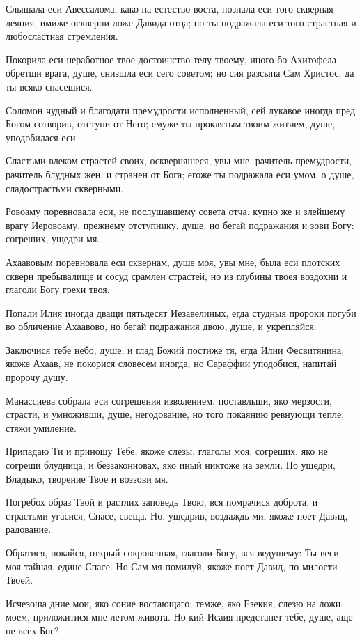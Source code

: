 Слышала еси Авессалома, како на естество воста, познала еси того скверная деяния, имиже оскверни ложе Давида отца; но ты подражала еси того страстная и любосластная стремления.

Покорила еси неработное твое достоинство телу твоему, иного бо Ахитофела обретши врага, душе, снизшла еси сего советом; но сия разсыпа Сам Христос, да ты всяко спасешися.

Соломон чудный и благодати премудрости исполненный, сей лукавое иногда пред Богом сотворив, отступи от Него; емуже ты проклятым твоим житием, душе, уподобилася еси.

Сластьми влеком страстей своих, оскверняшеся, увы мне, рачитель премудрости, рачитель блудных жен, и странен от Бога; егоже ты подражала еси умом, о душе, сладострастьми скверными.

Ровоаму поревновала еси, не послушавшему совета отча, купно же и злейшему врагу Иеровоаму, прежнему отступнику, душе, но бегай подражания и зови Богу: согреших, ущедри мя.

Ахаавовым поревновала еси сквернам, душе моя, увы мне, была еси плотских скверн пребывалище и сосуд срамлен страстей, но из глубины твоея воздохни и глаголи Богу грехи твоя.

Попали Илия иногда дващи пятьдесят Иезавелиных, егда студныя пророки погуби во обличение Ахаавово, но бегай подражания двою, душе, и укрепляйся.

Заключися тебе небо, душе, и глад Божий постиже тя, егда Илии Фесвитянина, якоже Ахаав, не покорися словесем иногда, но Сараффии уподобися, напитай пророчу душу.

Манассиева собрала еси согрешения изволением, поставльши, яко мерзости, страсти, и умноживши, душе, негодование, но того покаянию ревнующи тепле, стяжи умиление.

Припадаю Ти и приношу Тебе, якоже слезы, глаголы моя: согреших, яко не согреши блудница, и беззаконновах, яко иный никтоже на земли. Но ущедри, Владыко, творение Твое и воззови мя.

Погребох образ Твой и растлих заповедь Твою, вся помрачися доброта, и страстьми угасися, Спасе, свеща. Но, ущедрив, воздаждь ми, якоже поет Давид, радование.

Обратися, покайся, открый сокровенная, глаголи Богу, вся ведущему: Ты веси моя тайная, едине Спасе. Но Сам мя помилуй, якоже поет Давид, по милости Твоей.

Исчезоша дние мои, яко соние востающаго; темже, яко Езекия, слезю на ложи моем, приложитися мне летом живота. Но кий Исаия предстанет тебе, душе, аще не всех Бог?


